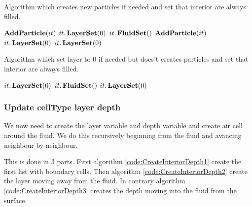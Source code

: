\begin{algorithm}
\caption{Algorithm which creates new particles if needed and set that interior are always filled.}
\label{code:LayerInitialWithParticleDepth}
\begin{algorithmic}[1]
				\State $\mathop{\textbf{AddParticle}}(it)$
				\State $it.\mathop{\textbf{LayerSet}}(0)$
				\State $it.\mathop{\textbf{FluidSet}}()$
				\State $\mathop{\textbf{AddParticle}}(it)$
				\State $it.\mathop{\textbf{LayerSet}}(0)$
				\State $it.\mathop{\textbf{LayerSet}}(0)$
			\EndIf
\EndFor
\EndProcedure
\end{algorithmic}
\end{algorithm}

\begin{algorithm}
\caption{Algorithm which set layer to 0 if needed but does't creates particles and set that interior are always filled.}
\label{code:CreateInteriorDepth}
\begin{algorithmic}[1]
				\State $it.\mathop{\textbf{LayerSet}}(0)$
				\State $it.\mathop{\textbf{FluidSet}}()$
				\State $it.\mathop{\textbf{LayerSet}}(0)$
			\EndIf
\EndFor
\EndProcedure
\end{algorithmic}
\end{algorithm}

\subsubsection{Update cellType layer depth}

We now need to create the layer variable and depth variable and create air cell around the fluid.
We do this recursively beginning from the fluid and avancing neighbour by neighbour.

This is done in 3 parts. First algorithm \ref{code:CreateInteriorDepth1} create the first list with boundary cells.
Then algorithm \ref{code:CreateInteriorDepth2} create the layer moving away from the fluid.
In contrary algorithm \ref{code:CreateInteriorDepth3} creates the depth moving into the fluid from the surface.

